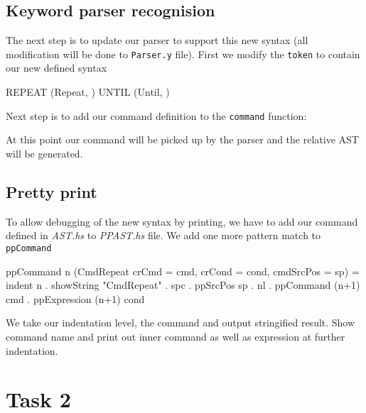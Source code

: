 \documentclass{article}
\begin{document}
\subsection{Keyword parser recognision}
\begin{flushleft}
The next step is to update our parser to support this new syntax (all modification will be done to \texttt{Parser.y} file). First we modify the \texttt{token} to contain our new defined syntax
\end{flushleft}
\begin{code}
REPEAT      { (Repeat, $$) }
UNTIL       { (Until, $$) }
\end{code}
\begin{flushleft}
Next step is to add our command definition to the \texttt{command} function:
\end{flushleft}
\begin{flushleft}
At this point our command will be picked up by the parser and the relative AST will be generated.
\end{flushleft}

\subsection{Pretty print}
\begin{flushleft}
To allow debugging of the new syntax by printing, we have to add our command defined in \textit{AST.hs} to \textit{PPAST.hs} file. We add one more pattern match to \texttt{ppCommand}
\end{flushleft}
\begin{code}
ppCommand n (CmdRepeat {crCmd = cmd, crCond = cond, cmdSrcPos = sp}) =
    indent n . showString "CmdRepeat" . spc . ppSrcPos sp . nl
    . ppCommand (n+1) cmd 
    . ppExpression (n+1) cond
\end{code}
\begin{flushleft}
We take our indentation level, the command and output stringified result. Show command name and print out inner command as well as expression at further indentation.
\end{flushleft}

\pagebreak

\section{Task 2}
\end{document}
